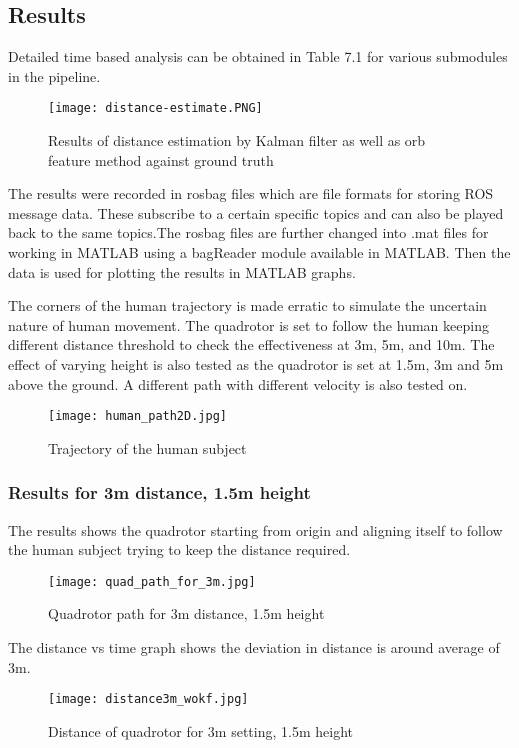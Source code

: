 \subsection{Results}
\label{sec:Results}

Detailed time based analysis can be obtained in Table 7.1 for various submodules in the pipeline.

\begin{figure}[htb]
	\centering
	\texttt{[image: distance-estimate.PNG]}
	\caption{Results of distance estimation by Kalman filter as
		well as orb feature method against ground truth\label{Result}}
\end{figure}

The results were recorded in rosbag files which are file formats for storing ROS message data. These subscribe to a certain specific topics and can also be played back to the same topics.The rosbag files are further changed into .mat files for working in MATLAB using a bagReader module available in MATLAB. Then the data is used for plotting the results in MATLAB graphs.

The corners of the human trajectory is made erratic to simulate the uncertain nature of human movement. The quadrotor is set to follow the human keeping different distance threshold to check the effectiveness at 3m, 5m, and 10m. The effect of varying height is also tested as the quadrotor is set at 1.5m, 3m and 5m above the ground. A different path with different velocity is also tested on.

\begin{figure}[htb]
	\centering
	\texttt{[image: human\_path2D.jpg]}
	\caption{Trajectory of the human subject\label{Trajectory of the human subject}}
\end{figure}

\subsubsection{Results for 3m distance, 1.5m height}
The results shows the quadrotor starting from origin and aligning itself to follow the human subject trying to keep the distance required.

\begin{figure}[htb]
	\centering
	\texttt{[image: quad\_path\_for\_3m.jpg]}
	\caption{Quadrotor path for 3m distance, 1.5m height\label{Quadrotor path for 3m distance, 1.5m height}}
\end{figure}

The distance vs time graph shows the deviation in distance is around average of 3m.
\begin{figure}[htb]
	\centering
	\texttt{[image: distance3m\_wokf.jpg]}
	\caption{Distance of quadrotor for 3m setting, 1.5m height\label{Distance of quadrotor for 3m setting, 1.5m height}}
\end{figure}

